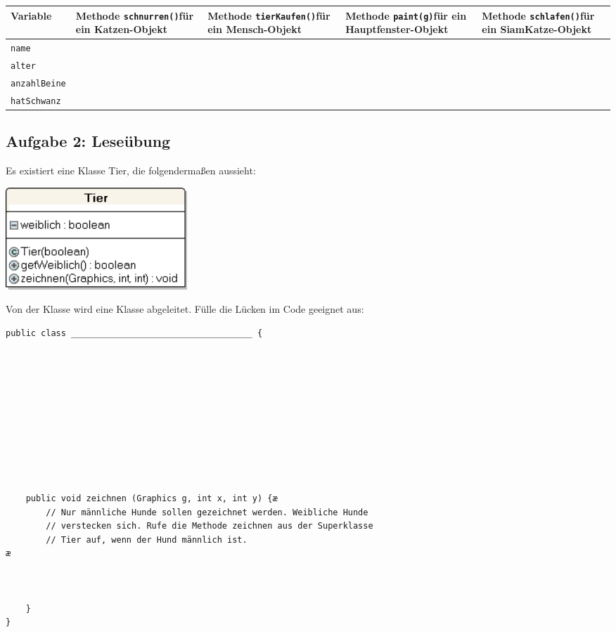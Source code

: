 \bgroup
\def\arraystretch{1.2}
\begin{tabular}{|l|p{30mm}|p{30mm}|p{30mm}|p{30mm}|}
\hline
\textbf{Variable} &
\textbf{Methode \lstinline|schnurren()|\linebreak für ein Katzen-Objekt} &
\textbf{Methode \lstinline|tierKaufen()|\linebreak für ein Mensch-Objekt} &
\textbf{Methode \linebreak \lstinline|paint(g)|\linebreak für ein Haupt\-fen\-ster-Objekt} & 
\textbf{Methode \lstinline|schlafen()|\linebreak für ein
SiamKatze-Objekt} \\
\hline \verb|name| & & & & \\ \hline
\verb|alter| & & & & \\ \hline
\verb|anzahlBeine| & & & & \\ \hline
\verb|hatSchwanz| & & & & \\ \hline
\end{tabular}
\egroup


\subsection{Aufgabe 2: Leseübung}

Es existiert eine Klasse Tier, die folgendermaßen aussieht:

\includegraphics[width=0.3\textwidth]{./inf/SEKII/16_Java_Vererbung/Aufgabe2.png}

Von der Klasse  wird eine Klasse  abgeleitet. Fülle
die Lücken im Code geeignet aus:

\begin{lstlisting}
public class ____________________________________ {











    public void zeichnen (Graphics g, int x, int y) {æ
        // Nur männliche Hunde sollen gezeichnet werden. Weibliche Hunde
        // verstecken sich. Rufe die Methode zeichnen aus der Superklasse
        // Tier auf, wenn der Hund männlich ist.
æ



    }
}
\end{lstlisting}

